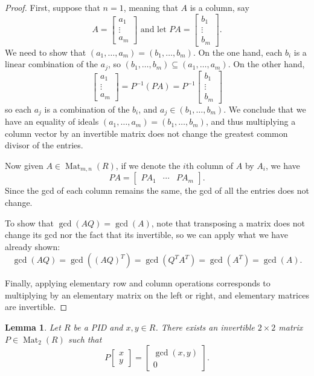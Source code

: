 \documentclass[12pt]{report}
\newtheorem{lemma}[theorem]{Lemma}
\numberwithin{equation}{section}
\numberwithin{theorem}{chapter}
\theoremstyle{definition}
\newtheorem*{basic properties}{Basic Properties}
\newtheorem*{Important Remark}{Important Remark}
\DeclareMathOperator{\M}{Mat}
\begin{document}
\begin{proof}
First, suppose that $n=1$, meaning that $A$ is a column, say
$$A = \begin{bmatrix} a_1 \\ \vdots \\ a_m\end{bmatrix} \textrm{ and let }
PA = \begin{bmatrix} b_1 \\ \vdots \\ b_m \end{bmatrix}.$$
We need to show that $(a_1, \ldots, a_m) = (b_1, \ldots, b_m)$. On the one hand, each $b_i$ is a linear combination of the $a_j$, so $(b_1, \ldots, b_m) \subseteq (a_1, \ldots, a_m)$. On the other hand, 
$$\begin{bmatrix} a_1 \\ \vdots \\ a_m\end{bmatrix} = P^{-1}(PA) = P^{-1} \begin{bmatrix} b_1 \\ \vdots \\ b_m\end{bmatrix}$$
so each $a_j$ is a combination of the $b_i$, and $a_j \in (b_1, \ldots, b_m)$. We conclude that we have an equality of ideals $(a_1, \ldots, a_m) = (b_1, \ldots, b_m)$, and thus multiplying a column vector by an invertible matrix does not change the greatest common divisor of the entries.

Now given $A \in \M_{m,n}(R)$, if we denote the $i$th column of $A$ by $A_i$, we have
$$PA = \begin{bmatrix} PA_1 & \cdots & PA_m \end{bmatrix}.$$
Since the gcd of each column remains the same, the gcd of all the entries does not change.

To show that $\gcd(AQ)=\gcd(A)$, note that transposing a matrix does not change its gcd nor the fact that its invertible, so we can apply what we have already shown:
$$\gcd(AQ) = \gcd((AQ)^T) = \gcd(Q^TA^T)=\gcd(A^T) = \gcd(A).$$

Finally, applying elementary row and column operations corresponds to multiplying by an elementary matrix on the left or right, and elementary matrices are invertible.
\end{proof}




\begin{lemma}\label{lemma gcd move by invertible}
	Let $R$ be a PID and $x, y \in R$. There exists an invertible $2 \times 2$ matrix $P \in \M_{2}(R)$ such that
	$$P \begin{bmatrix} x \\ y\end{bmatrix} = \begin{bmatrix} \gcd(x,y) \\ 0 \end{bmatrix}.$$
\end{lemma}
\end{document}
